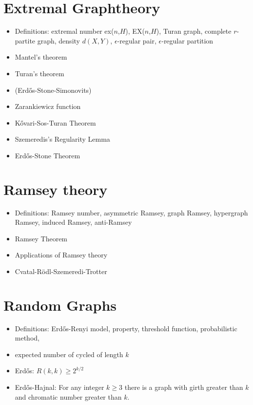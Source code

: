 \documentclass[a4paper]{article}
\begin{document}
\section{Extremal Graphtheory}                                   
\begin{itemize}
    \item Definitions: extremal number ex($n$,$H$), EX($n$,$H$), Turan graph,
    complete $r$-partite graph, density $d(X,Y)$, $\epsilon$-regular pair,
    $\epsilon$-regular partition

    \item Mantel's theorem
    \item Turan's theorem
    \item (Erd\H{o}s-Stone-Simonovits)
    \item Zarankiewicz function
    \item K\H{o}vari-Sos-Turan Theorem
    \item Szemeredis's Regularity Lemma
    \item Erd\H{o}s-Stone Theorem
\end{itemize}


\section{Ramsey theory}                                          
\begin{itemize}
    \item Definitions: Ramsey number, asymmetric Ramsey, graph Ramsey,
    hypergraph Ramsey, induced Ramsey, anti-Ramsey

    \item Ramsey Theorem
    \item Applications of Ramsey theory
    \item Cvatal-Rödl-Szemeredi-Trotter
\end{itemize}


\section{Random Graphs}                                          
\begin{itemize}
    \item Definitions: Erd\H{o}s-Renyi model, property, threshold function,
    probabilistic method, 

    \item  expected number of cycled of length $k$
    \item Erd\H{o}s: $R(k,k) \geq 2^{k/2}$
    \item Erd\H{o}s-Hajnal: For any integer $ k \geq 3 $ there is a graph 
    with girth greater than $ k $ and chromatic number greater than $ k $.
\end{itemize}
\end{document}
